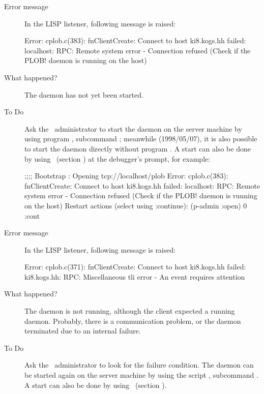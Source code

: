 \begin{description}
\item[Error message]
In the LISP listener, following message is raised:
\begin{CompactCode}
Error: cplob.c(383): fnClientCreate:
       Connect to host ki8.kogs.hh failed:
       localhost: RPC: Remote system error - Connection refused
       (Check if the PLOB! daemon is running on the host)
\end{CompactCode}

\item[What happened?] The daemon has not yet been started.
\item[To Do] Ask the \plob\ administrator to start the daemon on the
  server machine by using program , subcommand
  ; meanwhile (1998/05/07), it is also possible to start
  the daemon directly without program . A start can
  also be done by using \ (section
  ) at the debugger's prompt, for
  example:
\begin{IndentedCompactCode}
;;;; Bootstrap   : Opening tcp://localhost/plob
Error: cplob.c(383): fnClientCreate:
       Connect to host ki8.kogs.hh failed:
       localhost: RPC: Remote system error - Connection refused
       (Check if the PLOB! daemon is running on the host)
Restart actions (select using :continue):
\OmitUnimportant
\errlistener{}(p-admin :open)
0       
\errlistener{}:cont
\end{IndentedCompactCode}
\end{description}

\begin{description}
\item[Error message]
In the LISP listener, following message is raised:
\begin{CompactCode}
Error: cplob.c(371): fnClientCreate:
       Connect to host ki8.kogs.hh failed:
       ki8.kogs.hh: RPC: Miscellaneous tli error -
       An event requires attention
\end{CompactCode}

\item[What happened?] The daemon is not running, although the client
  expected a running daemon. Probably, there is a communication
  problem, or the daemon terminated due to an internal failure.
\item[To Do] Ask the \plob\ administrator to look for the failure
  condition. The daemon can be started again on the
  server machine by using the script , subcommand
  . A start can also be done by using \
  (section ).
\end{description}

